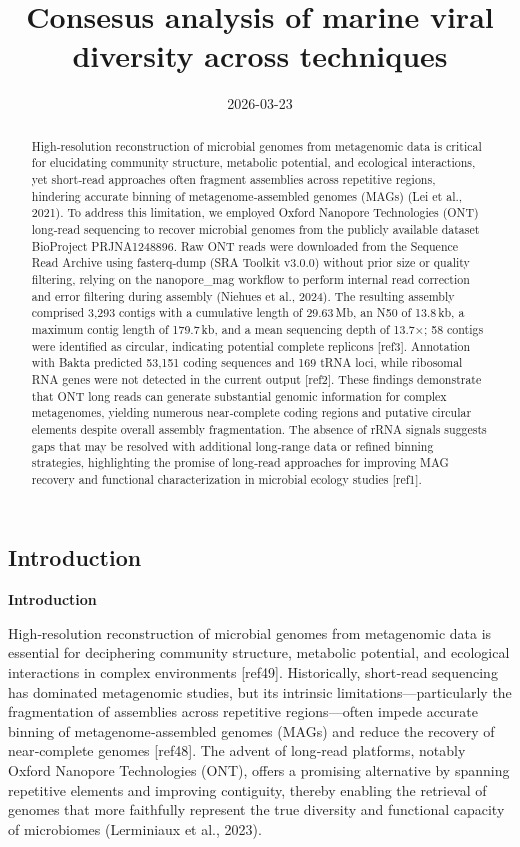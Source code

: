 \documentclass[
  11pt,
]{article}
\title{Consesus analysis of marine viral diversity across techniques}
\author{}
\date{2026-03-23}
\begin{document}
\maketitle
\begin{abstract}
High‑resolution reconstruction of microbial genomes from metagenomic
data is critical for elucidating community structure, metabolic
potential, and ecological interactions, yet short‑read approaches often
fragment assemblies across repetitive regions, hindering accurate
binning of metagenome‑assembled genomes (MAGs) (Lei et al., 2021). To
address this limitation, we employed Oxford Nanopore Technologies (ONT)
long‑read sequencing to recover microbial genomes from the publicly
available dataset BioProject PRJNA1248896. Raw ONT reads were downloaded
from the Sequence Read Archive using fasterq‑dump (SRA Toolkit v3.0.0)
without prior size or quality filtering, relying on the nanopore\_mag
workflow to perform internal read correction and error filtering during
assembly (Niehues et al., 2024). The resulting assembly comprised 3,293
contigs with a cumulative length of 29.63\,Mb, an N50 of 13.8\,kb, a
maximum contig length of 179.7\,kb, and a mean sequencing depth of
13.7×; 58 contigs were identified as circular, indicating potential
complete replicons {[}ref3{]}. Annotation with Bakta predicted 53,151
coding sequences and 169 tRNA loci, while ribosomal RNA genes were not
detected in the current output {[}ref2{]}. These findings demonstrate
that ONT long reads can generate substantial genomic information for
complex metagenomes, yielding numerous near‑complete coding regions and
putative circular elements despite overall assembly fragmentation. The
absence of rRNA signals suggests gaps that may be resolved with
additional long‑range data or refined binning strategies, highlighting
the promise of long‑read approaches for improving MAG recovery and
functional characterization in microbial ecology studies {[}ref1{]}.
\end{abstract}


\subsection{Introduction}\label{introduction}

\textbf{Introduction}

High‑resolution reconstruction of microbial genomes from metagenomic
data is essential for deciphering community structure, metabolic
potential, and ecological interactions in complex environments
{[}ref49{]}. Historically, short‑read sequencing has dominated
metagenomic studies, but its intrinsic limitations---particularly the
fragmentation of assemblies across repetitive regions---often impede
accurate binning of metagenome‑assembled genomes (MAGs) and reduce the
recovery of near‑complete genomes {[}ref48{]}. The advent of long‑read
platforms, notably Oxford Nanopore Technologies (ONT), offers a
promising alternative by spanning repetitive elements and improving
contiguity, thereby enabling the retrieval of genomes that more
faithfully represent the true diversity and functional capacity of
microbiomes (Lerminiaux et al., 2023).
\end{document}
